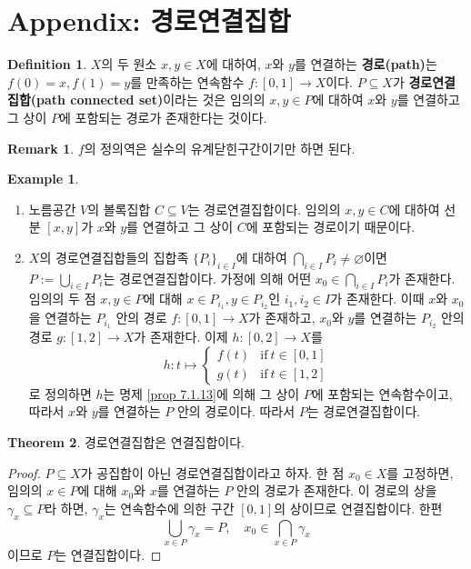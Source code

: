 \documentclass[11pt]{book}
\numberwithin{equation}{chapter}
\def\textif{\text{if}}
\theoremstyle{definition}
\newtheorem{thm}{Theorem}[section]
\newtheorem{defn}[thm]{Definition}
\newtheorem*{rem}{Remark}
\newtheorem*{ex}{Example}
\newenvironment{enum}
	{\begin{enumerate}[label=(\alph*), leftmargin=2\parindent]}
	{\end{enumerate}}
\begin{document}
\section{Appendix: 경로연결집합}

\begin{defn}
    \(X\)의 두 원소 \(x, y \in X\)에 대하여, \(x\)와 \(y\)를 연결하는 \textbf{경로(path)}는 \(f(0) = x, f(1) = y\)를 만족하는 연속함수 \(f : [0, 1] \to X\)이다. \(P \subseteq X\)가 \textbf{경로연결집합(path connected set)}이라는 것은 임의의 \(x, y \in P\)에 대하여 \(x\)와 \(y\)를 연결하고 그 상이 \(P\)에 포함되는 경로가 존재한다는 것이다.
\end{defn}

\begin{rem}
    \(f\)의 정의역은 실수의 유계닫힌구간이기만 하면 된다.
\end{rem}

\begin{ex}
    \quad

    \begin{enum}
        \item 노름공간 \(V\)의 볼록집합 \(C \subseteq V\)는 경로연결집합이다. 임의의 \(x, y \in C\)에 대하여 선분 \([x, y]\)가 \(x\)와 \(y\)를 연결하고 그 상이 \(C\)에 포함되는 경로이기 때문이다.
        \item \(X\)의 경로연결집합들의 집합족 \(\{P_i\}_{i \in I}\)에 대하여 \(\bigcap_{i \in I} P_i \ne \varnothing\)이면 \(P := \bigcup_{i \in I} P_i\)는 경로연결집합이다. 가정에 의해 어떤 \(x_0 \in \bigcap_{i \in I} P_i\)가 존재한다. 임의의 두 점 \(x, y \in P\)에 대해 \(x \in P_{i_1}, y \in P_{i_2}\)인 \(i_1, i_2 \in I\)가 존재한다. 이때 \(x\)와 \(x_0\)을 연결하는 \(P_{i_1}\) 안의 경로 \(f : [0, 1] \to X\)가 존재하고, \(x_0\)와 \(y\)를 연결하는 \(P_{i_2}\) 안의 경로 \(g : [1, 2] \to X\)가 존재한다. 이제 \(h : [0, 2] \to X\)를
        \[
        h : t \mapsto \begin{cases}
            f(t) &\textif \ t \in [0, 1]\\
            g(t) &\textif \ t \in [1, 2]
        \end{cases}    
        \]
        로 정의하면 \(h\)는 명제 \ref{prop 7.1.13}에 의해 그 상이 \(P\)에 포함되는 연속함수이고, 따라서 \(x\)와 \(y\)를 연결하는 \(P\) 안의 경로이다. 따라서 \(P\)는 경로연결집합이다.
    \end{enum}
    
\end{ex}

\begin{thm} \label{thm 7.6.2}
    경로연결집합은 연결집합이다.
\end{thm}
\begin{proof}
    \(P \subseteq X\)가 공집합이 아닌 경로연결집합이라고 하자. 한 점 \(x_0 \in X\)를 고정하면, 임의의 \(x \in P\)에 대해 \(x_0\)와 \(x\)를 연결하는 \(P\) 안의 경로가 존재한다. 이 경로의 상을 \(\gamma_x \subseteq P\)라 하면, \(\gamma_x\)는 연속함수에 의한 구간 \([0, 1]\)의 상이므로 연결집합이다. 한편
    \[
        \bigcup_{x \in P} \gamma_x = P, \quad x_0 \in \bigcap_{x \in P} \gamma_x
    \]
    이므로 \(P\)는 연결집합이다.
\end{proof}
\end{document}
